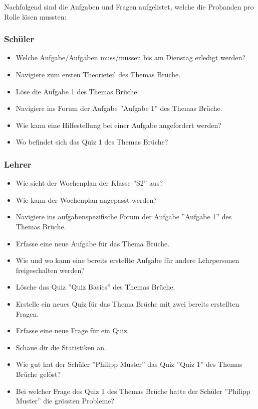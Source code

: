 Nachfolgend sind die Aufgaben und Fragen aufgelistet, welche die Probanden pro Rolle lösen mussten:

\subsubsection*{Schüler}
\begin{itemize}
	\item Welche Aufgabe/Aufgaben muss/müssen bis am Dienstag erledigt werden?
	\item Navigiere zum ersten Theorieteil des Themas Brüche.
	\item Löse die Aufgabe 1 des Themas Brüche.
	\item Navigiere ins Forum der Aufgabe ''Aufgabe 1'' des Themas Brüche.
	\item Wie kann eine Hilfestellung bei einer Aufgabe angefordert werden?
	\item Wo befindet sich das Quiz 1 des Themas Brüche?
\end{itemize}


\subsubsection*{Lehrer}
\begin{itemize}
	\item Wie sieht der Wochenplan der Klasse ''S2'' aus?
	\item Wie kann der Wochenplan angepasst werden?
	\item Navigiere ins aufgabenspezifische Forum der Aufgabe ''Aufgabe 1'' des Themas Brüche.
	\item Erfasse eine neue Aufgabe für das Thema Brüche.
	\item Wie und wo kann eine bereits erstellte Aufgabe für andere Lehrpersonen freigeschalten werden?
	\item Lösche das Quiz ''Quiz Basics'' des Themas Brüche.
	\item Erstelle ein neues Quiz für das Thema Brüche mit zwei bereits erstellten Fragen.
	\item Erfasse eine neue Frage für ein Quiz.
	\item Schaue dir die Statistiken an.
	\item Wie gut hat der Schüler ''Philipp Muster'' das Quiz ''Quiz 1'' des Themas Brüche gelöst?
	\item Bei welcher Frage des Quiz 1 des Themas Brüche hatte der Schüler ''Philipp Muster'' die grössten Probleme?
\end{itemize}


